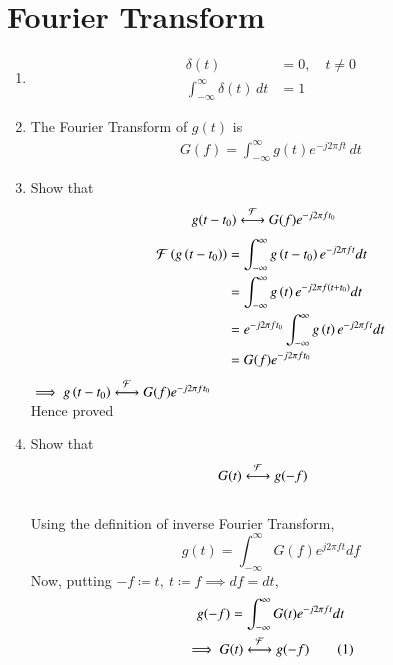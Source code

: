 \documentclass[journal,12pt,twocolumn]{IEEEtran}
\renewcommand\thesection{\arabic{section}}
\begin{document}
\section{Fourier Transform}
\begin{enumerate}[label=\thesection.\arabic*, ref=\thesection.\theenumi]

\item 
	\begin{align}
		\delta(t)&=0, \quad t\neq0 \\
		\int_{-\infty}^{\infty}\delta(t) \, dt&= 1
	\end{align}

\item The Fourier Transform of $g(t)$ is
	\begin{align}
		G(f)=\int_{-\infty}^{\infty}g(t)e^{-j2\pi ft}\,dt
	\end{align}


\item Show that 
	\begin{align}
		g(t-t_0)&\overset{\mathcal{F}}{ \longleftrightarrow}G(f)e^{-j2\pi ft_0}
	\end{align}
	\solution
	\begin{align*}
		\mathcal{F}\left(g\left(t-t_0\right)\right) &= \int_{-\infty}^\infty g\left(t-t_0\right) e^{-j2\pi ft} dt \\
		&= \int_{-\infty}^\infty g\left(t\right) e^{-j2\pi f\left(t+t_0\right)} dt \\
		&= e^{-j2\pi ft_0} \int_{-\infty}^\infty g\left(t\right) e^{-j2\pi ft} dt \\
		&= G(f) e^{-j2\pi ft_0}
	\end{align*}
	\( \implies g\left(t-t_0\right) \overset{\mathcal{F}}{ \longleftrightarrow} G(f) e^{-j2\pi ft_0} \) \\
	Hence proved


\item Show that 
	\begin{align}
		G(t)&\overset{\mathcal{F}}{ \longleftrightarrow}g(-f)
	\end{align}
	\solution\\
	Using the definition of inverse Fourier Transform,
	\[ g(t) = \int_{-\infty}^\infty G(f) e^{j2\pi ft} df \]
	Now, putting \( -f \coloneqq t, \ t \coloneqq f \implies df = dt \), \\
	\begin{gather*}
	    g(-f) = \int_{-\infty}^\infty G(t) e^{-j2\pi ft} dt\\
	    \implies G(t) \system{F} g(-f) \numberthis \label{eq:G-to-g}\\
	\end{gather*}



\end{enumerate}
\end{document}
